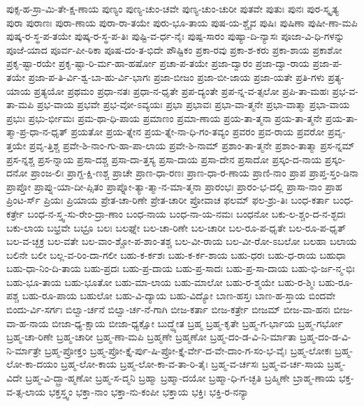 {ಪುಕ್ಸ-ಹ-ಸ್ರಾ-ಮಿ-ತೇ-ಕ್ಷ-ಣಾಯ
ಪುಣ್ಯಂ
ಪುಣ್ಯ-ಚುಂ-ಚವೇ
ಪುಣ್ಯ-ಚುಂ-ಚುರೀ
ಪುತವೇ
ಪುತುಃ
ಪುನಃ
ಪುರ-ಸ್ಕೃತ್ಯ
ಪುರಾ
ಪುರಾಣಃ
ಪುರಾ-ಣಾಯ
ಪುರಾ-ರಾ-ತಯೇ
ಪುರು-ಭೂ-ತಾಯ
ಪುಷ-ಯ-ಶ್ಚೈವ
ಪುಷಿಃ
ಪುಷಿಣಾ
ಪುಷೀ-ಣಾ-ಮಪಿ
ಪುಷ್ಕ-ರ-ಸ್ಥ-ಪ-ತಯೇ
ಪುಷ್ಕ-ರ-ಸ್ಥ-ಪ-ತಿಃ
ಪುಷ್ಟಿ-ವ-ರ್ಧ-ನೈಃ
ಪುಷ್ಪ-ಸಾರಂ
ಪುಷ್ಯಾ-ದಿ-ನ್ಯಾಸಃ
ಪೂಜಾ-ವಿ-ಧಿ-ಗಳನ್ನು
ಪೂಜೆ-ಯಾದ
ಪೂರ್ವ-ಪೀ-ಠಿಕಾ
ಪೂಷ-ದಂ-ತ-ಭಿದೇ
ಪೌಷ್ಟಿಕಂ
ಪ್ರಕಾ-ರವು
ಪ್ರಕಾ-ಶ-ಕರು
ಪ್ರಕಾ-ಶಾಯ
ಪ್ರಕಾಶೋ
ಪ್ರಕೃ-ಷ್ಟಾ-ರಯೇ
ಪ್ರಕೃ-ಷ್ಟಾ-ರಿ-ರ್ಮ-ಹಾ-ಹರ್ಷೋ
ಪ್ರಚಾ-ಪ-ತಯೇ
ಪ್ರಜಾ-ದ್ವಾರಂ
ಪ್ರಜಾ-ದ್ವಾ-ರಾಯ
ಪ್ರಜಾ-ಪ-ತಯೇ
ಪ್ರಜಾ-ಪ-ತಿ-ರ್ವಿ-ಶ್ವ-ಬಾ-ಹು-ರ್ವಿ-ಭಾಗಃ
ಪ್ರಜಾ-ಬೀಜಂ
ಪ್ರಜಾ-ಬೀ-ಜಾಯ
ಪ್ರಜಾ-ಯತೇ
ಪ್ರತಿ-ಗಳು
ಪ್ರತ್ಯ-ಯಾಯ
ಪ್ರತ್ಯಯೋ
ಪ್ರಥಮಂ
ಪ್ರಧಾ-ನತಃ
ಪ್ರಧಾ-ನ-ಧೃತೇ
ಪ್ರಪ-ದ್ಯಂತೇ
ಪ್ರಪ-ನ್ನ-ವ-ತ್ಸಲೋ
ಪ್ರಪಿ-ತಾ-ಮಹಃ
ಪ್ರಭ-ವ-ತಾ-ಮಪಿ
ಪ್ರಭ-ವಾಯ
ಪ್ರಭವೇ
ಪ್ರಭ-ವೋ-ಽವ್ಯಯಃ
ಪ್ರಭಾ
ಪ್ರಭಾವಃ
ಪ್ರಭಾ-ವಾ-ತ್ಮನೇ
ಪ್ರಭಾ-ವಾತ್ಮಾ
ಪ್ರಭಾ-ವಾಯ
ಪ್ರಭುಃ
ಪ್ರಭು-ರ್ಭೀಮಃ
ಪ್ರಮ-ಥಾ-ಧಿ-ಪಾಯ
ಪ್ರಮಾಣಂ
ಪ್ರಮಾ-ಣಾಯ
ಪ್ರಯ-ತಾ-ತ್ಮನಾ
ಪ್ರಯ-ತಾ-ತ್ಮನೇ
ಪ್ರಯ-ತಾ-ತ್ಮಾ-ಪ್ರ-ಧಾ-ನ-ಧೃತ್
ಪ್ರಯತೋ
ಪ್ರಯ-ತ್ನೇನ
ಪ್ರಯ-ತ್ನೇ-ನಾ-ಧಿ-ಗಂ-ತವ್ಯಂ
ಪ್ರವರಂ
ಪ್ರವ-ರಾಯ
ಪ್ರವರೋ
ಪ್ರವೃ-ತ್ತಯೇ
ಪ್ರವೃ-ತ್ತಿಶ್ಚ
ಪ್ರವೇ-ಶಿ-ನಾಂ-ಗು-ಹಾ-ಪಾ-ಲಾಯ
ಪ್ರವೇ-ಶಿ-ನಾಮ್
ಪ್ರಶಾಂ-ತಾ-ತ್ಮನೇ
ಪ್ರಶಾಂ-ತಾತ್ಮಾ
ಪ್ರಸ-ನ್ನಮ್
ಪ್ರಸ-ನ್ನಶ್ಚ
ಪ್ರಸ-ನ್ನಾಯ
ಪ್ರಸಾ-ದಶ್ಚ
ಪ್ರಸಾ-ದಾ-ತ್ತಸ್ಯ
ಪ್ರಸಾ-ದಾಯ
ಪ್ರಸಾ-ದೇನ
ಪ್ರಸಾದೋ
ಪ್ರಸ್ಕಂ-ದ-ನಾಯ
ಪ್ರಸ್ಕಂ-ದನೋ
ಪ್ರಾಂಜ-ಲಿಃ
ಪ್ರಾಗ್ದ-ಕ್ಷಿ-ಣಶ್ಚ
ಪ್ರಾಚೇ
ಪ್ರಾಣ-ಧಾ-ರಣಃ
ಪ್ರಾಣ-ಧಾ-ರ-ಣಾಯ
ಪ್ರಾಣಿ-ನಾಂ
ಪ್ರಾಪ
ಪ್ರಾಪ್ತ-ಸ್ತಂ-ಡಿನಾ
ಪ್ರಾಪ್ತೋ
ಪ್ರಾಪ್ನು-ಯಾ-ದೀ-ಪ್ಸಿತಂ
ಪ್ರಾಪ್ನೋ-ತ್ಯಾ-ತ್ಮಾ-ನ-ಮಾ-ತ್ಮನಾ
ಪ್ರಾರಂಭಃ
ಪ್ರಾರಂ-ಭ-ದಲ್ಲಿ
ಪ್ರಾಸಾ-ನಾಂ
ಪ್ರಾಹ
ಪ್ರಿಂಟ-ರ್ಸ್
ಪ್ರಿಯಃ
ಪ್ರಿಯಾಯ
ಪ್ರೇತ-ಚಾ-ರಿಣೇ
ಪ್ರೇತ-ಚಾರೀ
ಪ್ರೋವಾಚ
ಫಲಮ್
ಫಲ-ಶ್ರು-ತಿಃ
ಬಂಧ-ಕರ್ತಾ
ಬಂಧ-ಕರ್ತ್ರೇ
ಬಂಧ-ನ-ಸ್ತ್ವ-ಸು-ರೇಂ-ದ್ರಾ-ಣಾಂ
ಬಂಧ-ನಾಯ
ಬಂಧ-ನಾ-ಯ-ನಮಃ
ಬಂಧನೋ
ಬಕು-ಲ-ಶ್ಚಂ-ದ-ನ-ಶ್ಛದಃ
ಬಕು-ಲಾಯ
ಬಭ್ರವೇ
ಬಭ್ರೂ
ಬಲಃ
ಬಲಘ್ನೇ
ಬಲ-ಚಾ-ರಿಣೇ
ಬಲ-ಚಾರೀ
ಬಲ-ರೂ-ಪ-ಧೃತೇ
ಬಲ-ರೂ-ಪ-ಧೃತ್
ಬಲ-ವ-ಚ್ಛಕ್ರ
ಬಲ-ವತೇ
ಬಲ-ವಾಂ-ಶ್ಚೋ-ಪ-ಶಾಂ-ತಶ್ಚ
ಬಲ-ವೀ-ರಾಯ
ಬಲ-ವೀ-ರೋ-ಽಬಲೋ
ಬಲಹಾ
ಬಲಾಯ
ಬಲಿನೇ
ಬಲೀ
ಬಲ್ಲ-ವ-ರಿಂ-ದಾ-ಗಲೀ
ಬಹು-ಕ-ರ್ಕಶಃ
ಬಹು-ಕ-ರ್ಕ-ಶಾಯ
ಬಹು-ಧರಃ
ಬಹು-ಧ-ರಾಯ
ಬಹುಧಾ
ಬಹು-ಧಾ-ನಿಂ-ದಿ-ತಾಯ
ಬಹು-ಪ್ರದಃ
ಬಹು-ಪ್ರ-ದಾಯ
ಬಹು-ಪ್ರ-ಸಾದಃ
ಬಹು-ಪ್ರ-ಸಾ-ದಾಯ
ಬಹು-ಭಿ-ರ್ಜ-ನ್ಮ-ಭಿಃ
ಬಹು-ಭೂ-ತಾಯ
ಬಹು-ಭೂತೋ
ಬಹು-ಮಾ-ಲಾಯ
ಬಹು-ಮಾಲೋ
ಬಹು-ರ-ಶ್ಮಯೇ
ಬಹು-ರ-ಶ್ಮಿಃ
ಬಹು-ರೂ-ಪಶ್ಚ
ಬಹು-ರೂ-ಪಾಯ
ಬಹುಲೋ
ಬಹು-ವಿ-ದ್ಯಾಯ
ಬಹು-ವಿದ್ಯೋ
ಬಾಣ-ಹಸ್ತಃ
ಬಾಣ-ಹ-ಸ್ತಾಯ
ಬಿಂದವೇ
ಬಿಂದು-ರ್ವಿ-ಸರ್ಗಃ
ಬಿಲ್ವಾ-ರ್ಚನೆ
ಬಿಲ್ವಾ-ರ್ಚ-ನೆ-ಗಾಗಿ
ಬೀಜ-ಕರ್ತಾ
ಬೀಜ-ಕರ್ತ್ರೇ
ಬೀಜಮ್
ಬೀಜ-ವಾ-ಹನಃ
ಬೀಜ-ವಾ-ಹ-ನಾಯ
ಬೀಜಾ-ಧ್ಯ-ಕ್ಷಾಯ
ಬೀಜಾ-ಧ್ಯಕ್ಷೋ
ಬುದ್ಧ್ಯೇತ
ಬ್ರಹ್ಮ
ಬ್ರಹ್ಮ-ಕೃತೇ
ಬ್ರಹ್ಮ-ಗ-ರ್ಭಾಯ
ಬ್ರಹ್ಮ-ಗರ್ಭೋ
ಬ್ರಹ್ಮ-ಚಾ-ರಿಣೇ
ಬ್ರಹ್ಮ-ಚಾರೀ
ಬ್ರಹ್ಮ-ಣಾ-ಮಪಿ
ಬ್ರಹ್ಮಣೇ
ಬ್ರಹ್ಮಣೋ
ಬ್ರಹ್ಮ-ದಂ-ಡ-ವಿ-ನಿ-ರ್ಮಾತಾ
ಬ್ರಹ್ಮ-ದಂ-ಡ-ವಿ-ನಿ-ರ್ಮಾತ್ರೇ
ಬ್ರಹ್ಮ-ಪ್ರೋಕ್ತಂ
ಬ್ರಹ್ಮ-ಪ್ರೋ-ಕ್ತೈ-ರ್ಪು-ಷಿ-ಪ್ರೋ-ಕ್ತೈ-ರ್ವೇ-ದ-ವೇ-ದಾಂ-ಗ-ಸಂ-ಭ-ವೈಃ
ಬ್ರಹ್ಮ-ಲೋಕಃ
ಬ್ರಹ್ಮ-ಲೋ-ಕಾ-ದಯಂ
ಬ್ರಹ್ಮ-ಲೋ-ಕಾಯ
ಬ್ರಹ್ಮ-ಲೋ-ಕಾ-ವ-ತಾ-ರಿ-ತೈಃ
ಬ್ರಹ್ಮ-ವ-ರ್ಚಸಃ
ಬ್ರಹ್ಮ-ವ-ರ್ಚ-ಸಾಯ
ಬ್ರಹ್ಮ-ವಿದೇ
ಬ್ರಹ್ಮ-ವಿ-ದ್ಬ್ರಾ-ಹ್ಮಣೋ
ಬ್ರಹ್ಮ-ಸ-ದ್ಮನಿ
ಬ್ರಹ್ಮಾ
ಬ್ರಹ್ಮಾ-ದಯೋ
ಬ್ರಹ್ಮಾ-ಧಿ-ಗ-ಚ್ಛತಿ
ಬ್ರಹ್ಮಿಣೇ
ಬ್ರಾಹ್ಮ-ಣಾಯ
ಭಕ್ತ-ವ-ತ್ಸ-ಲಾಯ
ಭಕ್ತಸ್ತ್ವಂ
ಭಕ್ತಾ-ನಾಂ
ಭಕ್ತಾ-ನು-ಕಂಪೀ
ಭಕ್ತಾಯ
ಭಕ್ತಿಃ
ಭಕ್ತಿ-ರ-ನನ್ಯಾ
}

